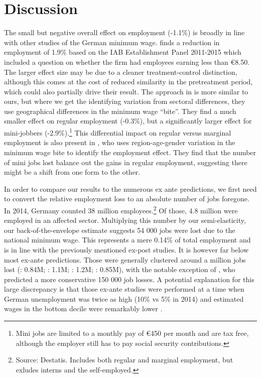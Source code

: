 \section{Discussion} \label{chap:discussion}


The small but negative overall effect on employment (-1.1\%) is broadly in line with other studies of the German minimum wage. \citet{Bossler2016} finds a reduction in employment of 1.9\% based on the IAB Establishment Panel 2011-2015 which included a question on whether the firm had employees earning less than €8.50. The larger effect size may be due to a cleaner treatment-control distinction, although this comes at the cost of reduced similarity in the pretreatment period, which could also partially drive their result. The approach in \citet{Caliendo2018le} is more similar to ours, but where we get the identifying variation from sectoral differences, they use geographical differences in the minimum wage ``bite''. They find a much smaller effect on regular employment (-0.3\%), but a significantly larger effect for mini-jobbers (-2.9\%).\footnote{Mini jobs are limited to a monthly pay of €450 per month and are tax free, although the employer still has to pay social security contributions.} This differential impact on regular versus marginal employment is also present in \citet{Garloff2016}, who uses region-age-gender variation in the minimum wage bite to identify the employment effect. They find that the number of mini jobs lost balance out the gains in regular employment, suggesting there might be a shift from one form to the other.

In order to compare our results to the numerous ex ante predictions, we first need to convert the relative employment loss to an absolute number of jobs foregone. In 2014, Germany counted 38 million employees.\footnote{Source: Destatis. Includes both regular and marginal employment, but exludes interns and the self-employed.} Of those, 4.8 million were employed in an affected sector. Multiplying this number by our semi-elasticity, our back-of-the-envelope estimate suggests 54 000 jobs were lost due to the national minimum wage. This represents a mere 0.14\% of total employment and is in line with the previously mentioned ex-post studies. It is however far below most ex-ante predictions. Those were generally clustered around a million jobs lost (\citealp{Knabe2008}: 0.84M; \citealp{Ragnitz2007}: 1.1M; \citealp{Bachmann2008}: 1.2M; \citealp{Bauer2009}: 0.85M), with the notable exception of \citet{Muller2010}, who predicted a more conservative 150 000 job losses. A potential explanation for this large discrepancy is that those ex-ante studies were performed at a time when German unemployment was twice as high (10\% vs 5\% in 2014) and estimated wages in the bottom decile were remarkably lower \citep{Muller2013}.

